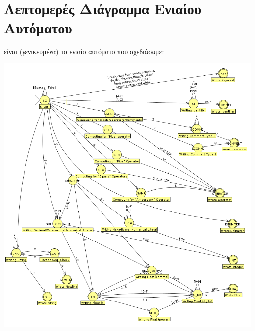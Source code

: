 \documentclass[14pt]{extarticle}
\begin{document}
\section{Λεπτομερές Διάγραμμα Ενιαίου Αυτόματου}
 είναι (γενικευμένα) το ενιαίο αυτόματο που σχεδιάσαμε:
  \begin{center}
\includegraphics[scale=0.45]{automata_detailed.png}
  \end{center}
\end{document}
